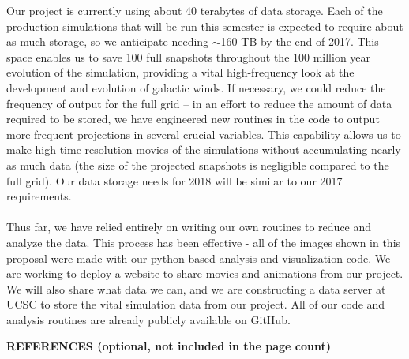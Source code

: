 \documentclass[11pt,letterpaper,english]{article}
\begin{document}
Our project is currently using about 40 terabytes of data storage. Each of the production simulations that will be run this semester is expected to require about as much storage, so we anticipate needing $\sim$160 TB by the end of 2017. This space enables us to save 100 full snapshots throughout the 100 million year evolution of the simulation, providing a vital high-frequency look at the development and evolution of galactic winds. If necessary, we could reduce the frequency of output for the full grid -- in an effort to reduce the amount of data required to be stored, we have engineered new routines in the code to output more frequent projections in several crucial variables. This capability allows us to make high time resolution movies of the simulations without accumulating nearly as much data (the size of the projected snapshots is negligible compared to the full grid). Our data storage needs for 2018 will be similar to our 2017 requirements.
~\\~\\
Thus far, we have relied entirely on writing our own routines to reduce and analyze the data. This
process has been effective - all of the images shown in this proposal were made with our python-based analysis and visualization code. We are working to deploy a website to share movies and animations from our project. We will also share what data we can, and we are constructing a data server at UCSC to store the vital simulation
data from our project. All of our code and analysis routines are already publicly available on GitHub.

\vspace{.08in}
\textbf{REFERENCES (optional, not included in the page count)}
\vspace{6pt}

\end{document}
